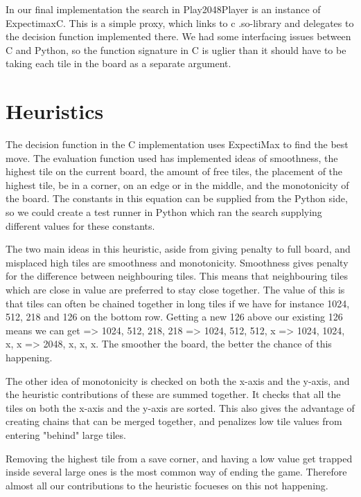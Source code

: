 In our final implementation the search in Play2048Player is an instance of
ExpectimaxC. This is a simple proxy, which links to c .so-library and delegates
to the decision function implemented there. We had some interfacing issues between
C and Python, so the function signature in C is uglier than it should have to
be taking each tile in the board as a separate argument.

\section{Heuristics}

The decision function in the C implementation uses ExpectiMax to find the best move.
The evaluation function used has implemented ideas of smoothness, the highest tile
on the current board, the amount of free tiles, the placement of the highest tile,
be in a corner, on an edge or in the middle, and the monotonicity of the board.
The constants in this equation can be supplied from the Python side, so we
could create a test runner in Python which ran the search supplying different
values for these constants.

The two main ideas in this heuristic, aside from giving penalty to full board, and
misplaced high tiles are smoothness and monotonicity. Smoothness gives penalty
for the difference between neighbouring tiles. This means that neighbouring tiles
which are close in value are preferred to stay close together. The value of this is
that tiles can often be chained together in long tiles if we have for instance
1024, 512, 218 and 126 on the bottom row. Getting a new 126 above our existing 126
means we can get => 1024, 512, 218, 218 => 1024, 512, 512, x => 1024, 1024, x, x =>
2048, x, x, x. The smoother the board, the better the chance of this happening.

The other idea of monotonicity is checked on both the x-axis and the y-axis, and
the heuristic contributions of these are summed together. It checks that all the tiles
on both the x-axis and the y-axis are sorted. This also gives the advantage of
creating chains that can be merged together, and penalizes low tile values from
entering "behind" large tiles.

Removing the highest tile from a save corner, and having a low value get trapped
inside several large ones is the most common way of ending the game. Therefore
almost all our contributions to the heuristic focueses on this not happening.
